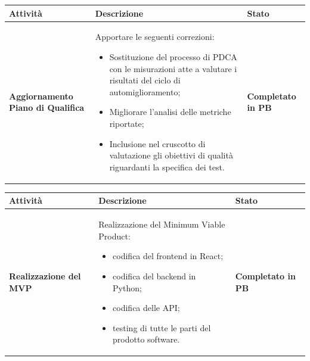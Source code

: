 \documentclass[a4paper,12pt]{article}
\begin{document}
        {\renewcommand{\arraystretch}{1.4}
            \begin{table}[H]
            \centering
            \begin{tabularx}{\textwidth}{|X|X|X|}
                \hline
                \rowcolor{gold}
		    \textbf{Attività} & \textbf{Descrizione} & \textbf{Stato}\\
                \hline
		      \textbf{Aggiornamento Piano di Qualifica} & Apportare le seguenti correzioni:
		    \begin{itemize}
			    \item Sostituzione del processo di PDCA con le misurazioni atte a valutare i risultati del ciclo di automiglioramento;
			    \item Migliorare l'analisi delle metriche riportate;
			    \item Inclusione nel cruscotto di valutazione gli obiettivi di qualità riguardanti la specifica dei test.
		    \end{itemize}		    & \textbf{Completato in PB} \\
                \hline
              \end{tabularx}      
            \end{table}
        }

        {\renewcommand{\arraystretch}{1.4}
            \begin{table}[H]
            \centering
            \begin{tabularx}{\textwidth}{|X|X|X|}
                \hline
                \rowcolor{gold}
		    \textbf{Attività} & \textbf{Descrizione} & \textbf{Stato}\\
                \hline
		      \textbf{Realizzazione del MVP} & Realizzazione del Minimum Viable Product:
		    \begin{itemize}
			    \item codifica del frontend in React;
                \item codifica del backend in Python;
                \item codifica delle API;
                \item testing di tutte le parti del prodotto software.
		    \end{itemize}
            & \textbf{Completato in PB} \\
                \hline
              \end{tabularx}      
            \end{table}
        }
\end{document}
